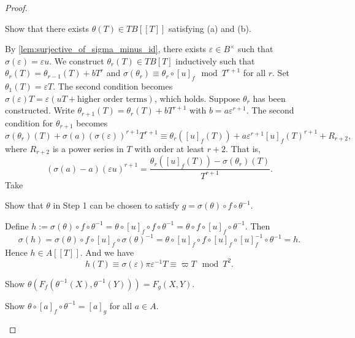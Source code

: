   \begin{proof}
    \hspace{1em}
    \begin{step}
      Show that there exists $\theta(T) \in T B[[T]]$ satisfying (a) and (b).
    \end{step}
    By \cref{lem:surjective_of_sigma_minus_id}, there exists $\varepsilon \in B^\times$ such that $\sigma(\varepsilon) = \varepsilon u$.
    We construct $\theta_r(T) \in T B[T]$ inductively such that $\theta_r(T) = \theta_{r-1}(T) + b T^r$ and $\sigma(\theta_r) \equiv \theta_r \circ [u]_f \mod T^{r+1}$ for all $r$.
    Set $\theta_1(T) = \varepsilon T$.
    The second condition becomes $\sigma(\varepsilon) T = \varepsilon (u T + \text{higher order terms})$, which holds.
    Suppose $\theta_{r}$ has been constructed.
    Write $\theta_{r+1}(T) = \theta_r(T) + b T^{r+1}$ with $b = a \varepsilon^{r+1}$.
    The second condition for $\theta_{r+1}$ becomes
    \[ \sigma(\theta_r)(T) + \sigma(a) (\sigma(\varepsilon))^{r+1} T^{r+1} \equiv \theta_r([u]_f(T)) + a \varepsilon^{r+1} [u]_f(T)^{r+1} + R_{r+2}, \]
    where $R_{r+2}$ is a power series in $T$ with order at least $r+2$.
    That is,
    \[ (\sigma(a) - a) (\varepsilon u)^{r+1} = \frac{\theta_r([u]_f(T)) - \sigma(\theta_r)(T)}{T^{r+1}}. \]
    Take 
    \Yang{}


    \begin{step}
      Show that $\theta$ in Step 1 can be chosen to satisfy $g = \sigma(\theta) \circ f \circ \theta^{-1}$.
    \end{step}
    Define $h := \sigma(\theta) \circ f \circ \theta^{-1} = \theta \circ [u]_f \circ f \circ \theta^{-1} = \theta \circ f \circ [u]_f \circ \theta^{-1}$.
    Then 
    \[ \sigma(h) = \sigma(\theta) \circ f \circ [u]_f \circ \sigma(\theta)^{-1} = \theta \circ [u]_f \circ f \circ [u]_f \circ [u]_f^{-1} \circ \theta^{-1} = h. \]
    Hence $h \in A[[T]]$.
    And we have 
    \[ h(T) \equiv \sigma(\varepsilon) \pi \varepsilon^{-1} T \equiv \varpi T \mod T^2. \]
    

    \begin{step}
      Show $\theta(F_f(\theta^{-1}(X), \theta^{-1}(Y))) = F_g(X,Y)$.
    \end{step}

    \begin{step}
      Show $\theta \circ [a]_f \circ \theta^{-1} = [a]_g$ for all $a \in A$.
    \end{step}


    \Yang{}
  \end{proof}

